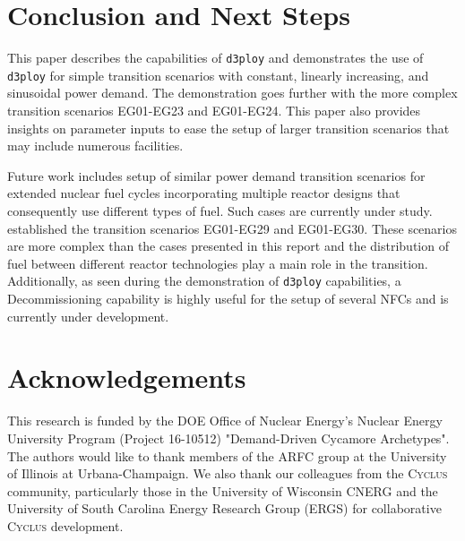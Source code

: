 \documentclass[11pt]{article}
\newcommand{\Cyclus}{\textsc{Cyclus}\xspace}%
\newcommand{\deploy}{\texttt{d3ploy}\xspace}%
\begin{document}
\section{Conclusion and Next Steps}
This paper describes the capabilities of \deploy and demonstrates 
the use of \deploy for simple transition scenarios with 
constant, linearly increasing, and sinusoidal power demand.
The demonstration goes further with the more complex transition
scenarios EG01-EG23 and EG01-EG24. This paper also provides insights on
parameter inputs to ease the setup of larger transition scenarios
that may include numerous facilities.

Future work includes setup of similar power demand transition 
scenarios for extended nuclear fuel cycles incorporating multiple reactor designs that consequently use different types of fuel. Such cases are 
currently under study. \cite{wigeland_nuclear_2014} established the transition
scenarios EG01-EG29 and EG01-EG30. These scenarios are more complex than the
cases presented in this report and the distribution of fuel between different
reactor technologies play a main role in the transition.
Additionally, as seen during the demonstration of \deploy capabilities, a Decommissioning capability is highly useful for the setup of several NFCs and is currently under development.

\section{Acknowledgements}
This research is funded by the \gls{DOE} Office of 
Nuclear Energy's Nuclear Energy University Program (Project 16-10512) 
"Demand-Driven Cycamore Archetypes". The authors would like to thank 
members of the \gls{ARFC} group at the University of Illinois at 
Urbana-Champaign. 
We also thank our colleagues from the \Cyclus community, 
particularly those in the University of Wisconsin 
\gls{CNERG} and the University of South Carolina Energy Research 
Group (ERGS) for collaborative \Cyclus development.

\pagebreak 


\end{document}
